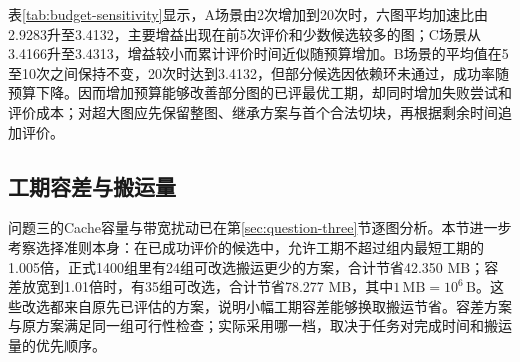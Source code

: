 表\ref{tab:budget-sensitivity}显示，A场景由2次增加到20次时，六图平均加速比由2.9283升至3.4132，主要增益出现在前5次评价和少数候选较多的图；C场景从3.4166升至3.4313，增益较小而累计评价时间近似随预算增加。B场景的平均值在5至10次之间保持不变，20次时达到3.4132，但部分候选因依赖环未通过，成功率随预算下降。因而增加预算能够改善部分图的已评最优工期，却同时增加失败尝试和评价成本；对超大图应先保留整图、继承方案与首个合法切块，再根据剩余时间追加评价。

\subsection{工期容差与搬运量}
问题三的Cache容量与带宽扰动已在第\ref{sec:question-three}节逐图分析。本节进一步考察选择准则本身：在已成功评价的候选中，允许工期不超过组内最短工期的1.005倍，正式1400组里有24组可改选搬运更少的方案，合计节省42.350 MB；容差放宽到1.01倍时，有35组可改选，合计节省78.277 MB，其中$1\,\mathrm{MB}=10^6\,\mathrm B$。这些改选都来自原先已评估的方案，说明小幅工期容差能够换取搬运节省。容差方案与原方案满足同一组可行性检查；实际采用哪一档，取决于任务对完成时间和搬运量的优先顺序。
